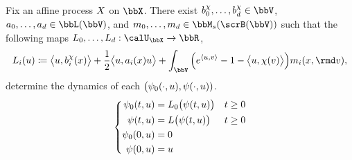 \begin{theorem}
  \label{theorem:affine-regularity}
  Fix an affine process $X$ on $\stateSpace$.
  There exist $\affDriftPart^\trunc_0, \ldots, \affDriftPart^\trunc_d \in \vecSpace$, $\affDiffPart_0, \ldots, \affDiffPart_d \in \linSpace(\vecSpace)$, and $\affJumpPart_0, \ldots, \affJumpPart_d \in \signedMeasSpace{\scrB(\vecSpace)}$ such that the following maps $L_0,\ldots,L_d: \boundedSpace \rightarrow \bbR$,
  \begin{equation*}
    \odePart_i(\momentVar)
    \defeq \bprj{\momentVar}{\affDriftPart_i^\trunc(\stateVar)} + \frac12\bprj{\momentVar}{\affDiffPart_i(\stateVar)\momentVar} + \int_\vecSpace \Big( e^\prj{\momentVar}{\markVar} - 1 - \bprj{\momentVar}{\trunc(\markVar)} \Big) \affJumpPart_i(\stateVar, \rmd\markVar),
  \end{equation*}
  determine the dynamics of each $\big(\psi_0(\cdot,u), \psi(\cdot,u))$.
  \begin{equation*}
    \left\{\begin{aligned}
      \psi_0(t,u) &= L_0\big(\psi(t, u)\big) & t \geq 0 \\
      \psi(t,u) &= L\big(\psi(t,u)\big) & t \geq 0 \\
      \psi_0(0,u) &= 0 \\
      \psi(0, u) &= u
    \end{aligned}\right.
  \end{equation*}
\end{theorem}
